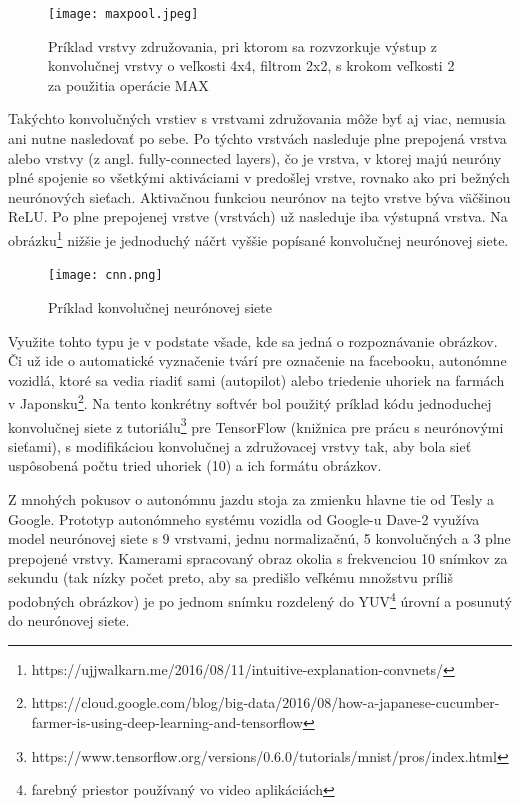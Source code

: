 	\begin{figure}[H]
		\begin{center}\texttt{[image: maxpool.jpeg]}\end{center}
		\caption[Vrstva združovania - príklad vzorkovania]{Príklad vrstvy združovania, pri ktorom sa rozvzorkuje výstup z konvolučnej vrstvy o veľkosti 4x4, filtrom 2x2, s krokom veľkosti 2 za použitia operácie MAX}\label{fig:cnn}
	\end{figure}
	Takýchto konvolučných vrstiev s vrstvami združovania môže byť aj viac, nemusia ani nutne nasledovať po sebe. Po týchto vrstvách nasleduje plne prepojená vrstva alebo vrstvy (z angl. fully-connected layers), čo je vrstva, v ktorej majú neuróny plné spojenie so všetkými aktiváciami v predošlej vrstve, rovnako ako pri bežných neurónových sieťach. Aktivačnou funkciou neurónov na tejto vrstve býva väčšinou ReLU. Po plne prepojenej vrstve (vrstvách) už nasleduje iba výstupná vrstva. Na obrázku\footnote{https://ujjwalkarn.me/2016/08/11/intuitive-explanation-convnets/} nižšie je jednoduchý náčrt vyššie popísané konvolučnej neurónovej siete. 
	\begin{figure}[H]
		\begin{center}\texttt{[image: cnn.png]}\end{center}
		\caption[Konvolučná neurónová sieť]{Príklad konvolučnej neurónovej siete}\label{conv_nn}
	\end{figure}
	
	Využite tohto typu je v podstate všade, kde sa jedná o rozpoznávanie obrázkov. Či už ide o automatické vyznačenie tvárí pre označenie na facebooku, autonómne vozidlá, ktoré sa vedia riadiť sami (autopilot) alebo triedenie uhoriek na farmách v Japonsku\footnote{https://cloud.google.com/blog/big-data/2016/08/how-a-japanese-cucumber-farmer-is-using-deep-learning-and-tensorflow}. Na tento konkrétny softvér bol použitý príklad kódu jednoduchej konvolučnej siete z tutoriálu\footnote{https://www.tensorflow.org/versions/0.6.0/tutorials/mnist/pros/index.html} pre TensorFlow (knižnica pre prácu s neurónovými sieťami), s modifikáciou konvolučnej a združovacej vrstvy tak, aby bola sieť uspôsobená počtu tried uhoriek (10) a ich formátu obrázkov. 
	
	
	Z mnohých pokusov o autonómnu jazdu stoja za zmienku hlavne tie od Tesly a Google. Prototyp autonómneho systému vozidla od Google-u Dave-2\cite{google_car} využíva model neurónovej siete s 9 vrstvami, jednu normalizačnú, 5 konvolučných a 3 plne prepojené vrstvy. Kamerami spracovaný obraz okolia s frekvenciou 10 snímkov za sekundu (tak nízky počet preto, aby sa predišlo veľkému množstvu príliš podobných obrázkov) je po jednom snímku rozdelený do YUV\footnote{farebný priestor používaný vo video aplikáciách} úrovní a posunutý do neurónovej siete.   
 

